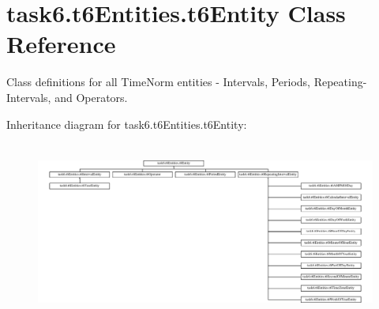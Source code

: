 \hypertarget{classtask6_1_1t6Entities_1_1t6Entity}{}\section{task6.\+t6\+Entities.\+t6\+Entity Class Reference}
\label{classtask6_1_1t6Entities_1_1t6Entity}


Class definitions for all Time\+Norm entities -\/ Intervals, Periods, Repeating-\/\+Intervals, and Operators.  


Inheritance diagram for task6.\+t6\+Entities.\+t6\+Entity\+:\begin{figure}[H]
\begin{center}
\leavevmode
\includegraphics[height=5.918699cm]{classtask6_1_1t6Entities_1_1t6Entity}
\end{center}
\end{figure}
